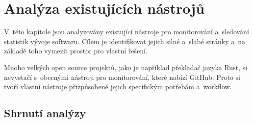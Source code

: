 


\chapter{Analýza existujících nástrojů}
\label{chap:existing_tools}

V~této kapitole jsou analyzovány existující nástroje pro monitorování a~sledování statistik vývoje softwaru. Cílem je identifikovat jejich silné a~slabé stránky a~na základě toho vymezit prostor pro vlastní řešení.

Mnoho velkých open source projektů, jako je například překladač jazyka Rust, si nevystačí s~obecnými nástroji pro monitorování, které nabízí GitHub. Proto si tvoří vlastní nástroje přizpůsobené jejich specifickým potřebám a~workflow.





\section{Shrnutí analýzy}
\label{sec:existing_tools:summary}

